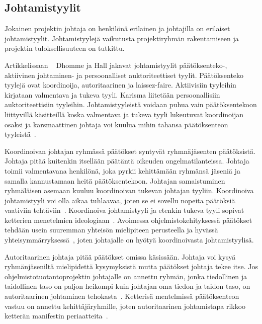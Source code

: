 \documentclass[finnish]{tktltiki2}
\theoremstyle{definition}
\theoremstyle{remark}
\begin{document}
\subsection{Johtamistyylit}

Jokainen projektin johtaja on henkilönä erilainen ja johtajilla on erilaiset johtamistyylit. Johtamistyylejä vaikutusta projektiryhmän rakentamiseen ja projektin tuloksellisuuteen on tutkittu. 

Artikkelissaan ~\cite{Dhomne:2012:ITL:2382887.2382899} Dhomme ja Hall jakavat johtamistyylit päätöksenteko-, aktiivinen johtaminen- ja persoonalliset auktoriteettiset tyylit. Päätöksenteko tyylejä ovat koordinoija, autoritaarinen ja laissez-faire. Aktiivisiin tyyleihin kirjataan valmentava ja tukeva tyyli. Karisma liitetään persoonallisiin auktoriteettisiin tyyleihin. Johtamistyyleistä voidaan puhua vain päätöksentekoon liittyvillä käsitteillä koska valmentava ja tukeva tyyli lukeutuvat koordinoijan osaksi ja karsmaattinen johtaja voi kuulua mihin tahansa päätöksenteon tyyleistä~\cite{Dhomne:2012:ITL:2382887.2382899}. 

Koordinoivan johtajan ryhmässä päätökset syntyvät ryhmnäjäsenten päätöksistä. Johtaja pitää kuitenkin itsellään päätäntä oikeuden ongelmatilanteissa. Johtaja toimii valmentavana henkilönä, joka pyrkii kehittämään ryhmänsä jäseniä ja samalla kannustamaan heitä päätöksentekoon. Johtajan samaistuminen ryhmäläisen asemaan kuuluu koordinoivan tukevan johtajan tyyliin. Koordinoiva johtamistyyli voi olla aikaa tuhlaavaa, joten se ei sovellu nopeita päätöksiä vaativiin tehtäviin~\cite{Dhomne:2012:ITL:2382887.2382899}. Koordinoiva johtamistyyli ja etenkin tukeva tyyli sopivat ketterien menetelmien ideologiaan~\cite{fowler2001agile}. Avoimessa ohjelmistokehityksessä päätökset tehdään usein suuremman yhteisön mielipiteen perusteella ja hyvässä yhteisymmärryksessä~\cite{1385637}, joten johtajalle on hyötyä koordinoivasta johtamistyylisä.

Autoritaarinen johtaja pitää päätökset omissa käsissään. Johtaja voi kysyä ryhmänjäseniltä mielipidettä kysymyksistä mutta päätökset johtaja tekee itse. Jos ohjelmistotuotantoprojektin johtajalle on annettu ryhmän, jonka tiedollinen ja taidollinen taso on paljon heikompi kuin johtajan oma tiedon ja taidon taso, on autoritaarinen johtaminen tehokasta~\cite{Dhomne:2012:ITL:2382887.2382899}. Ketterisä mentelmissä päätöksenteon vastuu on annettu kehittäjäryhmille, joten autoritaarinen johtamistapa rikkoo ketterän manifestin periaatteita~\cite{fowler2001agile}.
\end{document}
